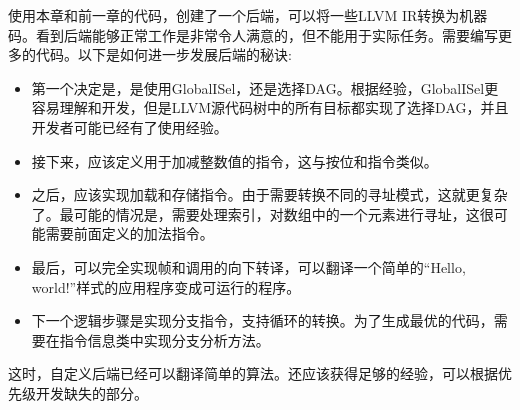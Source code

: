 使用本章和前一章的代码，创建了一个后端，可以将一些LLVM IR转换为机器码。看到后端能够正常工作是非常令人满意的，但不能用于实际任务。需要编写更多的代码。以下是如何进一步发展后端的秘诀:

\begin{itemize}
\item
第一个决定是，是使用GlobalISel，还是选择DAG。根据经验，GlobalISel更容易理解和开发，但是LLVM源代码树中的所有目标都实现了选择DAG，并且开发者可能已经有了使用经验。

\item
接下来，应该定义用于加减整数值的指令，这与按位和指令类似。

\item
之后，应该实现加载和存储指令。由于需要转换不同的寻址模式，这就更复杂了。最可能的情况是，需要处理索引，对数组中的一个元素进行寻址，这很可能需要前面定义的加法指令。

\item
最后，可以完全实现帧和调用的向下转译，可以翻译一个简单的“Hello, world!”样式的应用程序变成可运行的程序。

\item
下一个逻辑步骤是实现分支指令，支持循环的转换。为了生成最优的代码，需要在指令信息类中实现分支分析方法。
\end{itemize}

这时，自定义后端已经可以翻译简单的算法。还应该获得足够的经验，可以根据优先级开发缺失的部分。

















